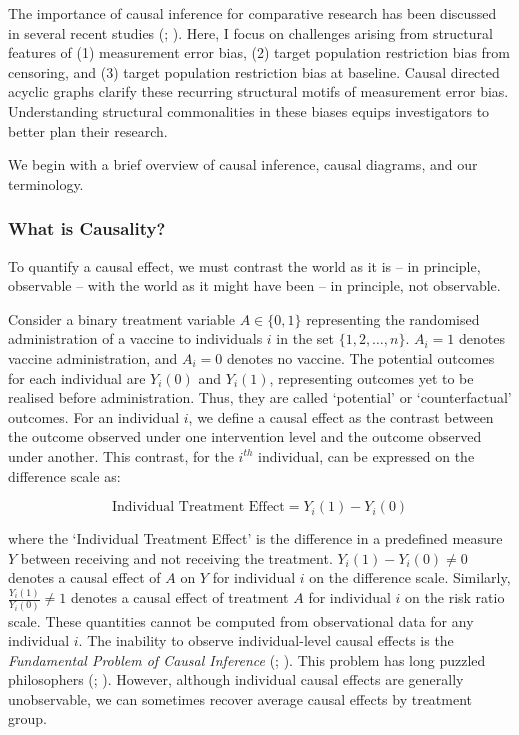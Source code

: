 \documentclass[
  single column]{article}
\begin{document}
The importance of causal inference for comparative research has been
discussed in several recent studies
(;
). Here, I focus
on challenges arising from structural features of (1) measurement error
bias, (2) target population restriction bias from censoring, and (3)
target population restriction bias at baseline. Causal directed acyclic
graphs clarify these recurring structural motifs of measurement error
bias. Understanding structural commonalities in these biases equips
investigators to better plan their research.

We begin with a brief overview of causal inference, causal diagrams, and
our terminology.

\subsubsection{What is Causality?}\label{what-is-causality}

To quantify a causal effect, we must contrast the world as it is -- in
principle, observable -- with the world as it might have been -- in
principle, not observable.

Consider a binary treatment variable \(A \in \{0,1\}\) representing the
randomised administration of a vaccine to individuals \(i\) in the set
\(\{1, 2, \ldots, n\}\). \(A_i = 1\) denotes vaccine administration, and
\(A_i = 0\) denotes no vaccine. The potential outcomes for each
individual are \(Y_i(0)\) and \(Y_i(1)\), representing outcomes yet to
be realised before administration. Thus, they are called `potential' or
`counterfactual' outcomes. For an individual \(i\), we define a causal
effect as the contrast between the outcome observed under one
intervention level and the outcome observed under another. This
contrast, for the \(i^{th}\) individual, can be expressed on the
difference scale as:

\[
\text{Individual Treatment Effect} = Y_i(1) - Y_i(0)
\]

where the `Individual Treatment Effect' is the difference in a
predefined measure \(Y\) between receiving and not receiving the
treatment. \(Y_i(1) - Y_i(0) \neq 0\) denotes a causal effect of \(A\)
on \(Y\) for individual \(i\) on the difference scale. Similarly,
\(\frac{Y_i(1)}{Y_i(0)} \neq 1\) denotes a causal effect of treatment
\(A\) for individual \(i\) on the risk ratio scale. These quantities
cannot be computed from observational data for any individual \(i\). The
inability to observe individual-level causal effects is the
\emph{Fundamental Problem of Causal Inference}
(;
). This problem has long puzzled
philosophers (;
). However, although individual
causal effects are generally unobservable, we can sometimes recover
average causal effects by treatment group.
\end{document}
